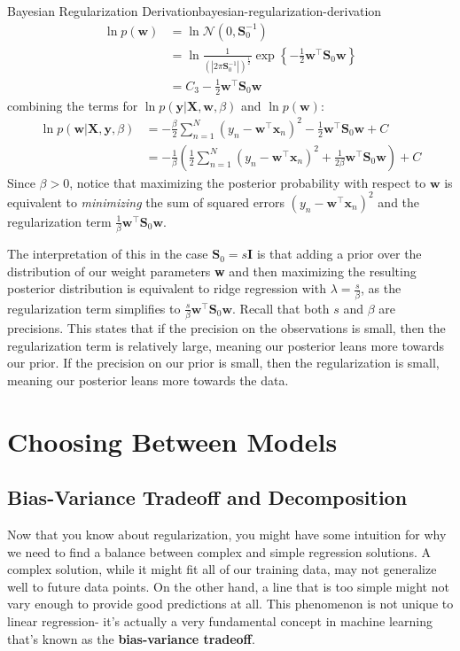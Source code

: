\begin{derivation}{Bayesian Regularization Derivation}{bayesian-regularization-derivation}
    \begin{align*}
        \ln{p(\textbf{w})} &= \ln{\mathcal{N}(0, \mathbf{S}_{0}^{-1})} \\
        &= \ln{\frac{1}{(|2\pi\mathbf{S}_{0}^{-1}|)^{\frac{1}{2}}} \exp{\left\{-\frac{1}{2}\textbf{w}^\top\mathbf{S}_{0}\textbf{w}\right\}}} \\
        &= C_3 -\frac{1}{2} \textbf{w}^\top\mathbf{S}_{0} \textbf{w}
    \end{align*}
    combining the terms for $\ln{p(\textbf{y}| \textbf{X}, \textbf{w}, \beta)}$ and $\ln{p(\textbf{w})}$:
    \begin{align*}
        \ln{p(\textbf{w}|\textbf{X},\textbf{y}, \beta)} &= -\frac{\beta}{2}\sum_{n=1}^{N} (y_{n} - \textbf{w}^\top \textbf{x}_{n})^2 - \frac{1}{2} \textbf{w}^\top\mathbf{S}_{0} \textbf{w} + C \\
        &= -\frac{1}{\beta}\left(\frac{1}{2}\sum_{n=1}^{N} (y_{n} - \textbf{w}^\top \textbf{x}_{n})^2 + \frac{1}{2\beta} \textbf{w}^\top\mathbf{S}_{0} \textbf{w}\right) + C
    \end{align*}
    Since $\beta > 0$, notice that maximizing the posterior probability with respect to $\mathbf{w}$ is equivalent to \textit{minimizing} the sum of squared errors $(y_{n} - \textbf{w}^\top \textbf{x}_{n})^2$ and the regularization term $\frac{1}{\beta}\textbf{w}^\top\mathbf{S}_0\textbf{w}$.
\end{derivation}

{The interpretation of this in the case $\mathbf{S}_0 = s\mathbf{I}$ is that adding a prior over the distribution of our weight parameters \textbf{w} and then maximizing the resulting posterior distribution is equivalent to ridge regression with $\lambda = \frac{s}{\beta}$, as the regularization term simplifies to $\frac{s}{\beta}\mathbf{w}^\top \mathbf{S}_0 \mathbf{w}$. Recall that both $s$ and $\beta$ are precisions. This states that if the precision on the observations is small, then the regularization term is relatively large, meaning our posterior leans more towards our prior. If the precision on our prior is small, then the regularization is small, meaning our posterior leans more towards the data.}

\section{Choosing Between Models}
\subsection{Bias-Variance Tradeoff and Decomposition}
Now that you know about regularization, you might have some intuition for why we need to find a balance between complex and simple regression solutions. A complex solution, while it might fit all of our training data, may not generalize well to future data points. On the other hand, a line that is too simple might not vary enough to provide good predictions at all. This phenomenon is not unique to linear regression- it's actually a very fundamental concept in machine learning that's known as the \textbf{bias-variance tradeoff}.

